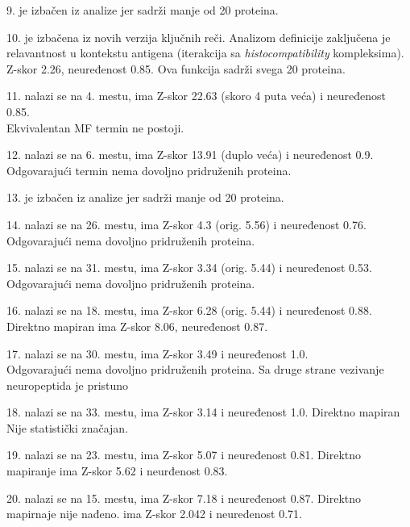 9.  je izbačen iz analize jer sadrži manje od 20 proteina.

10.  je izbačena iz novih verzija ključnih reči.
Analizom definicije  zaključena je relavantnost
u kontekstu antigena (iterakcija sa \textit{histocompatibility} kompleksima).
Z-skor 2.26, neuređenost 0.85. Ova funkcija sadrži svega 20 proteina.

11.  nalazi se na 4. mestu, ima Z-skor 22.63 (skoro 4 puta veća) i neuređenost 0.85.
\\ Ekvivalentan MF termin ne postoji.


12.  nalazi se na 6. mestu, ima Z-skor 13.91 (duplo veća) i neuređenost 0.9.
\\ Odgovarajući termin  nema dovoljno pridruženih proteina.

13.  je izbačen iz analize jer sadrži manje od 20 proteina.

14.  nalazi se na 26. mestu, ima Z-skor 4.3 (orig. 5.56) i neuređenost 0.76.
\\ Odgovarajući  nema dovoljno pridruženih proteina.

15.  nalazi se na 31. mestu, ima Z-skor 3.34 (orig. 5.44) i neuređenost 0.53.
\\ Odgovarajući  nema dovoljno pridruženih proteina.

16.  nalazi se na 18. mestu, ima Z-skor 6.28 (orig. 5.44) i neuređenost 0.88.
Direktno mapiran  ima Z-skor 8.06, neuređenost 0.87.

17.  nalazi se na 30. mestu, ima Z-skor 3.49 i neuređenost 1.0.
\\ Odgovarajući  nema dovoljno pridruženih proteina. Sa druge strane vezivanje neuropeptida je pristuno 

18.  nalazi se na 33. mestu, ima Z-skor 3.14 i neuređenost 1.0.
Direktno mapiran  Nije statistički značajan.

19.  nalazi se na 23. mestu, ima Z-skor 5.07 i neuređenost 0.81.
Direktno mapiranje  ima Z-skor 5.62 i neurđenost 0.83.

20.  nalazi se na 15. mestu, ima Z-skor 7.18 i neuređenost 0.87.
Direktno mapirnaje nije nađeno.
 ima Z-skor 2.042 i neuređenost 0.71.


